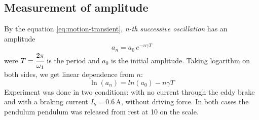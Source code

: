 \documentclass[12pt,a4paper]{article}
\begin{document}
	\subsection{Measurement of amplitude}
	By the equation \ref{eq:motion-transient}, \textit{n-th successive oscillation} has an amplitude
	\begin{equation}\label{eq:n-th-amplitude}
	a_n = a_0 \, e^{-n \gamma T} 
	\end{equation}
	were $T=\cfrac{2 \pi}{\omega_1}$ is the period and $a_0$ is the initial amplitude. Taking logarithm on both sides, we get linear dependence from $n$:
	\begin{equation}\label{eq:ln-n-th-amplitude}
	\ln(a_n) = ln(a_0) - n \gamma T
	\end{equation}
	Experiment was done in two conditions: with no current through the eddy brake and with a braking current $I_b = 0.6 \,\si{\ampere}$, without driving force. In both cases the pendulum pendulum was released from rest at 10 on the scale. 
	
\end{document}
